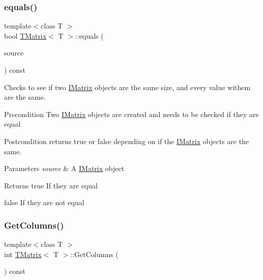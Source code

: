 \subsubsection{\texorpdfstring{equals()}{equals()}\hspace{0.1cm}{\footnotesize\ttfamily [6/6]}}
{\footnotesize\ttfamily template$<$class T $>$ \\
bool \mbox{\hyperlink{class_t_matrix}{T\+Matrix}}$<$ T $>$\+::equals (\begin{DoxyParamCaption}\item[{const \mbox{\hyperlink{class_i_matrix}{I\+Matrix}}$<$ \mbox{\hyperlink{class_d_matrix}{D\+Matrix}}$<$ T $>$, T $>$ \&}]{source }\end{DoxyParamCaption}) const}



Checks to see if two \mbox{\hyperlink{class_i_matrix}{I\+Matrix}} objects are the same size, and every value withem are the same. 

\begin{DoxyPrecond}{Precondition}
Two \mbox{\hyperlink{class_i_matrix}{I\+Matrix}} objects are created and needs to be checked if they are equal 
\end{DoxyPrecond}
\begin{DoxyPostcond}{Postcondition}
returns true or false depending on if the \mbox{\hyperlink{class_i_matrix}{I\+Matrix}} objects are the same.
\end{DoxyPostcond}

\begin{DoxyParams}{Parameters}
{\em source} & A \mbox{\hyperlink{class_i_matrix}{I\+Matrix}} object \\
\hline
\end{DoxyParams}
\begin{DoxyReturn}{Returns}
true If they are equal 

false If they are not equal 
\end{DoxyReturn}
\mbox{\label{class_t_matrix_ab4ca595133f10eadcebe6d78aa260d0c}} 
\subsubsection{\texorpdfstring{GetColumns()}{GetColumns()}}
{\footnotesize\ttfamily template$<$class T $>$ \\
int \mbox{\hyperlink{class_t_matrix}{T\+Matrix}}$<$ T $>$\+::Get\+Columns (\begin{DoxyParamCaption}{ }\end{DoxyParamCaption}) const\hspace{0.3cm}{\ttfamily [virtual]}}



